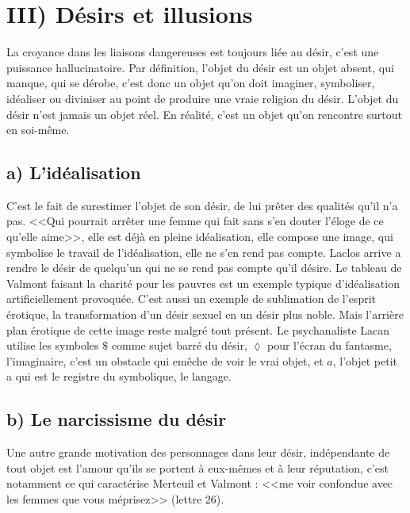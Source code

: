 \documentclass[12pt]{article}
\begin{document}
\section*{III) Désirs et illusions}
La croyance dans les liaisons dangereuses est toujours liée au désir, c'est une puissance hallucinatoire.
Par définition, l'objet du désir est un objet absent, qui manque, qui se dérobe, c'est donc un objet qu'on doit imaginer, symboliser, idéaliser ou diviniser au point de produire une vraie religion du désir.
L'objet du désir n'est jamais un objet réel. En réalité, c'est un objet qu'on rencontre surtout en soi-même.
\subsection*{a) L'idéalisation}
C'est le fait de surestimer l'objet de son désir, de lui prêter des qualités qu'il n'a pas.
<<Qui pourrait arrêter une femme qui fait sans s'en douter l'éloge de ce qu'elle aime>>, elle est déjà en pleine idéalisation, elle compose une image, qui symbolise le travail de l'idéalisation, elle ne s'en rend pas compte.
Laclos arrive a rendre le désir de quelqu'un qui ne se rend pas compte qu'il désire.
Le tableau de Valmont faisant la charité pour les pauvres est un exemple typique d'idéalisation artificiellement provoquée.
C'est aussi un exemple de sublimation de l'esprit érotique, la transformation d'un désir sexuel en un désir plus noble.
Mais l'arrière plan érotique de cette image reste malgré tout présent.
Le psychanaliste Lacan utilise les symboles $\$$ comme sujet barré du désir, $\lozenge$ pour l'écran du fantasme, l'imaginaire, c'est un obstacle qui emêche de voir le vrai objet, et $a$, l'objet petit a qui est le registre du symbolique, le langage.
\subsection*{b) Le narcissisme du désir}
Une autre grande motivation des personnages dans leur désir, indépendante de tout objet est l'amour qu'ils se portent à eux-mêmes et à leur réputation, c'est notamment ce qui caractérise Merteuil et Valmont : <<me voir confondue avec les femmes que vous méprisez>> (lettre 26).
\end{document}

